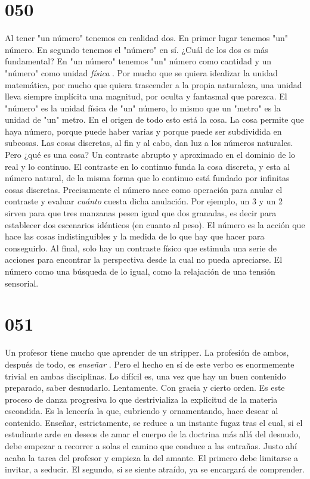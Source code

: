 \documentclass[a4paper,11pt,openright,twocolumn]{book}
\begin{document}
\section*{050}

Al tener "un número" tenemos en realidad dos. En primer lugar tenemos "un" número. En segundo tenemos el "número" en sí. ¿Cuál de los dos es más fundamental? En "un número" tenemos "un" número como cantidad y un "número" como unidad {\it física}  . Por mucho que se quiera idealizar la unidad matemática, por mucho que quiera trascender a la propia naturaleza, una unidad lleva siempre implícita una magnitud, por oculta y fantasmal que parezca. El "número" es la unidad física de "un" número, lo mismo que un "metro" es la unidad de "un" metro. En el origen de todo esto está la cosa. La cosa permite que haya número, porque puede haber varias y porque puede ser subdividida en subcosas. Las cosas discretas, al fin y al cabo, dan luz a los números naturales. Pero ¿qué es una cosa? Un contraste abrupto y aproximado en el dominio de lo real y lo continuo. El contraste en lo continuo funda la cosa discreta, y esta al número natural, de la misma forma que lo continuo está fundado por infinitas cosas discretas. Precisamente el número nace como operación para anular el contraste y evaluar {\it cuánto}   cuesta dicha anulación. Por ejemplo, un 3 y un 2 sirven para que tres manzanas pesen igual que dos granadas, es decir para establecer dos escenarios idénticos (en cuanto al peso). El número es la acción que hace las cosas indistinguibles y la medida de lo que hay que hacer para conseguirlo. Al final, solo hay un contraste físico que estimula una serie de acciones para encontrar la perspectiva desde la cual no pueda apreciarse. El número como una búsqueda de lo igual, como la relajación de una tensión sensorial.

\section*{051}

Un profesor tiene mucho que aprender de un stripper. La profesión de ambos, después de todo, es {\it enseñar}  . Pero el hecho en sí de este verbo es enormemente trivial en ambas disciplinas. Lo difícil es, una vez que hay un buen contenido preparado, saber desnudarlo. Lentamente. Con gracia y cierto orden. Es este proceso de danza progresiva lo que destrivializa la explicitud de la materia escondida. Es la lencería la que, cubriendo y ornamentando, hace desear al contenido. Enseñar, estrictamente, se reduce a un instante fugaz tras el cual, si el estudiante arde en deseos de amar el cuerpo de la doctrina más allá del desnudo, debe empezar a recorrer a solas el camino que conduce a las entrañas. Justo ahí acaba la tarea del profesor y empieza la del amante. El primero debe limitarse a invitar, a seducir. El segundo, si se siente atraído, ya se encargará de comprender.
\end{document}
